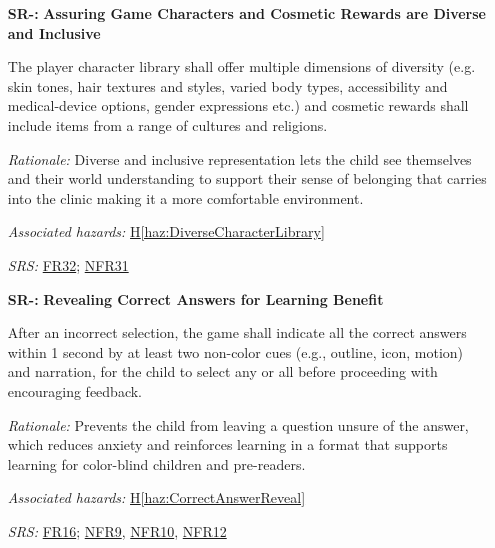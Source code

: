 \documentclass{article}
\newcounter{hazard}
\newcommand{\hazref}[1]{\hyperref[haz:#1]{H\ref*{haz:#1}}}
\newcounter{sr}
\newcommand{\srdef}[1]{\refstepcounter{sr}\label{sr:#1}\textbf{SR-\thesr:}}
\newcommand{\srsurl}{https://team-hindsight.github.io/ophthamology-game/SRS-IEEE/SRS.pdf}
\newcommand{\srsfrref}[2]{\href{\srsurl\#nameddest=#1}{FR#2}}
\newcommand{\srsnfrref}[2]{\href{\srsurl\#nameddest=#1}{NFR#2}}
\begin{document}
\begin{itemize}[leftmargin=1.5cm, labelwidth=1.3cm, labelsep=0.2cm,
  align=left, itemsep=1.2em, parsep=0.6em]
\textit{Rationale:}
The intended users are children aged three to
seven and may be sensitive to sudden or intense
audio and visual effects. Keeping effects
comfortable reduces avoidable distress while
preserving the educational purpose of the game.

\textit{Associated hazards:}
\hazref{UnsafeAudioVisuals}

\textit{SRS:} \srsfrref{FR_NarrationFallback}{15}, \srsfrref{FR_Preferences}{41}; \srsnfrref{NFR_AudioSafety}{15}, \srsnfrref{NFR_Flashing}{16}

\item[\srdef{CharacterDiversityInclusivity}]
\textbf{Assuring Game Characters and Cosmetic Rewards are Diverse and Inclusive}

The player character library shall offer multiple dimensions of 
diversity (e.g. skin tones, hair textures and styles, varied body types, 
accessibility and medical-device options, gender expressions etc.) and 
cosmetic rewards shall include items from a range of cultures and religions.

\textit{Rationale:}
Diverse and inclusive representation lets the child see themselves and their 
world understanding to support their sense of belonging that carries into the 
clinic making it a more comfortable environment.

\textit{Associated hazards:}
\hazref{DiverseCharacterLibrary}

\textit{SRS:} \srsfrref{FR_DiverseCharacters}{32}; \srsnfrref{NFR_Inclusivity}{31}

\item[\srdef{CorrectAnswerReveal}]
\textbf{Revealing Correct Answers for Learning Benefit}

After an incorrect selection, the game shall indicate all the correct answers
within 1 second by at least two non-color cues (e.g., outline, icon, motion) 
and narration, for the child to select any or all before proceeding with encouraging 
feedback.

\textit{Rationale:}
Prevents the child from leaving a question unsure of the answer, 
which reduces anxiety and reinforces learning in a format that supports 
learning for color-blind children and pre-readers.

\textit{Associated hazards:}
\hazref{CorrectAnswerReveal}

\textit{SRS:} \srsfrref{FR_RevealAnswer}{16}; \srsnfrref{NFR_Accessibility}{9}, \srsnfrref{NFR_Colour}{10}, \srsnfrref{NFR_Responsiveness}{12}


\end{itemize}
\end{document}
